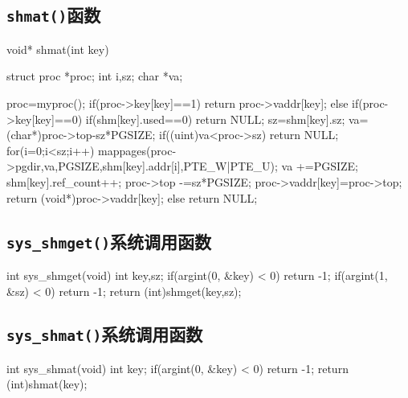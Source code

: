 \documentclass{swfuthesism}
\begin{document}
\subsection{\texttt{shmat()}函数}
\label{sec:shmat}
\begin{ccode}
void* shmat(int key)
{
  struct proc *proc;
  int i,sz;
  char *va;

  proc=myproc();
  if(proc->key[key]==1)
    return proc->vaddr[key];
  else if(proc->key[key]==0)
  {
    if(shm[key].used==0)
      return NULL;
    sz=shm[key].sz;
    va=(char*)proc->top-sz*PGSIZE;
    if((uint)va<proc->sz)
      return NULL;
    for(i=0;i<sz;i++){
      mappages(proc->pgdir,va,PGSIZE,shm[key].addr[i],PTE_W|PTE_U);
      va +=PGSIZE;
    }
    shm[key].ref_count++;
    proc->top -=sz*PGSIZE;
    proc->vaddr[key]=proc->top;
    return (void*)proc->vaddr[key];
  }
  else
    return NULL;
}
\end{ccode}

\subsection{\texttt{sys\_shmget()}系统调用函数}
\label{src:sysshmget}

\begin{ccode}
int sys_shmget(void)
{
  int key,sz;
  if(argint(0, &key) < 0)
    return -1;
  if(argint(1, &sz) < 0)
    return -1;
  return (int)shmget(key,sz);
}
\end{ccode}

\subsection{\texttt{sys\_shmat()}系统调用函数}
\label{src:sysshmat}

\begin{ccode}
int sys_shmat(void)
{
  int key;
  if(argint(0, &key) < 0)
    return -1;
  return (int)shmat(key);
}
\end{ccode}

\end{document}
